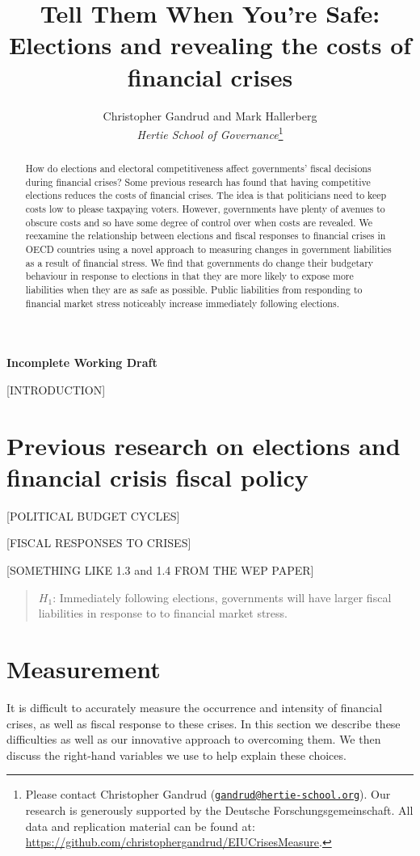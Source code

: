 \documentclass[]{article}
\title{Tell Them When You're Safe: Elections and revealing the costs of financial crises}
\author{Christopher Gandrud and Mark Hallerberg \\ \emph{Hertie School of Governance}\footnote{Please contact Christopher Gandrud
(\href{mailto:gandrud@hertie-school.org}{\nolinkurl{gandrud@hertie-school.org}}).
Our research is generously supported by the Deutsche Forschungsgemeinschaft.
All data and replication material can be found at:
\url{https://github.com/christophergandrud/EIUCrisesMeasure}.}}
\begin{document}
\maketitle


\textbf{Incomplete Working Draft}

\begin{abstract}
How do elections and electoral competitiveness affect governments' fiscal decisions during financial crises? Some previous research has found that having competitive elections reduces the costs of financial crises. The idea is that politicians need to keep costs low to please taxpaying voters. However, governments have plenty of avenues to obscure costs and so have some degree of control over when costs are revealed. We reexamine the relationship between elections and fiscal responses to financial crises in OECD countries using a novel approach to measuring changes in government liabilities as a result of financial stress. We find that governments do change their budgetary behaviour in response to elections in that they are more likely to expose more liabilities when they are as safe as possible. Public liabilities from responding to financial market stress noticeably increase immediately following elections.

\end{abstract}

[INTRODUCTION]

\section{Previous research on elections and financial crisis fiscal policy}

[POLITICAL BUDGET CYCLES]

[FISCAL RESPONSES TO CRISES]

[SOMETHING LIKE 1.3 and 1.4 FROM THE WEP PAPER]

\begin{quote}
        $H_{1}$: Immediately following elections, governments will have larger fiscal liabilities in response to to financial market stress.
\end{quote}

\section{Measurement}

It is difficult to accurately measure the occurrence and intensity of financial crises, as well as fiscal response to these crises. In this section we describe these difficulties as well as our innovative approach to overcoming them. We then discuss the right-hand variables we use to help explain these choices.
\end{document}
